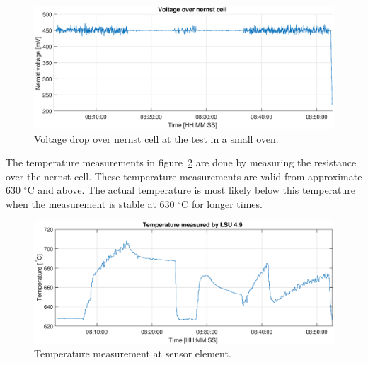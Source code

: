 \begin{figure}
    \centering
    \includegraphics[width = \textwidth]{Chapter4/Figures/nernst_second_small.eps}
    \caption{Voltage drop over nernst cell at the test in a small oven.}
    \label{fig:nernst_second_small}
\end{figure}

The temperature measurements in figure~\ref{fig:temperature_second_small} are done by measuring the resistance over the nernst cell. These temperature measurements are valid from approximate 630 $^\circ$C and above. The actual temperature is most likely below this temperature when the measurement is stable at 630 $^\circ$C for longer times.


\begin{figure}
    \centering
    \includegraphics[width = \textwidth]{Chapter4/Figures/temperature_second_small.eps}
    \caption{Temperature measurement at sensor element.}
    \label{fig:temperature_second_small}
\end{figure}

